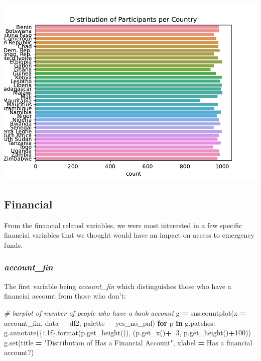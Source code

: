 \documentclass[water,article,submit,moreauthors,pdftex]{mdpi}
\newenvironment{Shaded}{\begin{snugshade}}{\end{snugshade}}
\newcommand{\BuiltInTok}[1]{#1}
\newcommand{\CommentTok}[1]{\textcolor[rgb]{0.56,0.35,0.01}{\textit{#1}}}
\newcommand{\ControlFlowTok}[1]{\textcolor[rgb]{0.13,0.29,0.53}{\textbf{#1}}}
\newcommand{\DecValTok}[1]{\textcolor[rgb]{0.00,0.00,0.81}{#1}}
\newcommand{\FloatTok}[1]{\textcolor[rgb]{0.00,0.00,0.81}{#1}}
\newcommand{\KeywordTok}[1]{\textcolor[rgb]{0.13,0.29,0.53}{\textbf{#1}}}
\newcommand{\NormalTok}[1]{#1}
\newcommand{\OperatorTok}[1]{\textcolor[rgb]{0.81,0.36,0.00}{\textbf{#1}}}
\newcommand{\SpecialCharTok}[1]{\textcolor[rgb]{0.00,0.00,0.00}{#1}}
\newcommand{\StringTok}[1]{\textcolor[rgb]{0.31,0.60,0.02}{#1}}
\begin{document}
\includegraphics{term_paper_files/figure-latex/unnamed-chunk-8-5.pdf}

\hypertarget{financial}{%
\subsection{Financial}\label{financial}}

From the financial related variables, we were most interested in a few
specific financial variables that we thought would have an impact on
access to emergency funds.

\hypertarget{account_fin}{%
\subsubsection{\texorpdfstring{\emph{account\_fin}}{account\_fin}}\label{account_fin}}

The first variable being \emph{account\_fin} which distinguishes those
who have a financial account from those who don't:

\begin{Shaded}
\begin{Highlighting}[]
\CommentTok{\# barplot of number of people who have a bank account}
\NormalTok{g }\OperatorTok{=}\NormalTok{ sns.countplot(x }\OperatorTok{=} \StringTok{\textquotesingle{}account\_fin\textquotesingle{}}\NormalTok{, data }\OperatorTok{=}\NormalTok{ df2, palette }\OperatorTok{=}\NormalTok{ yes\_no\_pal)}
\ControlFlowTok{for}\NormalTok{ p }\KeywordTok{in}\NormalTok{ g.patches:}
\NormalTok{   g.annotate(}\StringTok{\textquotesingle{}}\SpecialCharTok{\{:.1f\}}\StringTok{\textquotesingle{}}\NormalTok{.}\BuiltInTok{format}\NormalTok{(p.get\_height()), (p.get\_x()}\OperatorTok{+} \FloatTok{.3}\NormalTok{, p.get\_height()}\OperatorTok{+}\DecValTok{100}\NormalTok{))}
\NormalTok{g.}\BuiltInTok{set}\NormalTok{(title }\OperatorTok{=} \StringTok{"Distribution of Has a Financial Account"}\NormalTok{, xlabel }\OperatorTok{=} \StringTok{\textquotesingle{}Has a financial account?\textquotesingle{}}\NormalTok{)}
\end{Highlighting}
\end{Shaded}
\end{document}
